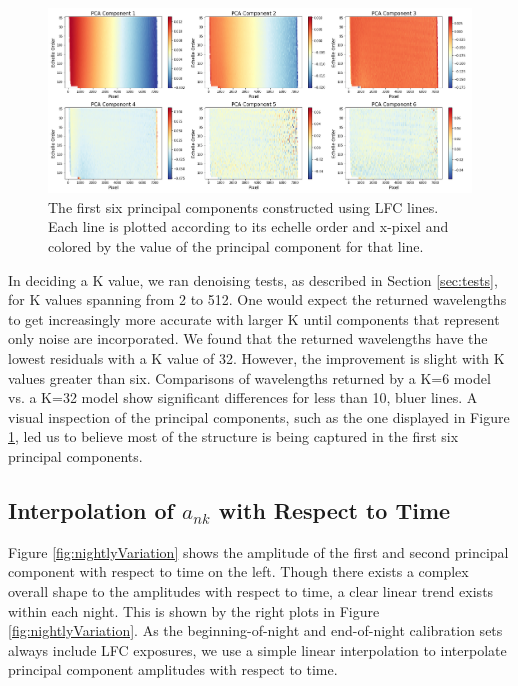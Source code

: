 \documentclass[12pt, onecolumn]{aastex63}
\begin{document}
\begin{figure}[t]
\centering
\includegraphics[width=\textwidth]{Figures/pcsLfc6.png}
\caption{The first six principal components constructed using LFC lines.  Each line is plotted according to its echelle order and x-pixel and colored by the value of the principal component for that line.}
\label{fig:pcLfc}
\end{figure}

In deciding a K value, we ran denoising tests, as described in Section \ref{sec:tests}, for K values spanning from 2 to 512.  One would expect the returned wavelengths to get increasingly more accurate with larger K until components that represent only noise are incorporated.  We found that the returned wavelengths have the lowest residuals with a K value of 32.  However, the improvement is slight with K values greater than six.  Comparisons of wavelengths returned by a K=6 model vs. a K=32 model show significant differences for less than 10, bluer lines.  A visual inspection of the principal components, such as the one displayed in Figure \ref{fig:pcLfc}, led us to believe most of the structure is being captured in the first six principal components.

\subsection{Interpolation of $a_{nk}$ with Respect to Time}
Figure \ref{fig:nightlyVariation} shows the amplitude of the first and second principal component with respect to time on the left.  Though there exists a complex overall shape to the amplitudes with respect to time, a clear linear trend exists within each night.  This is shown by the right plots in Figure  \ref{fig:nightlyVariation}.  As the beginning-of-night and end-of-night calibration sets always include LFC exposures, we use a simple linear interpolation to interpolate principal component amplitudes with respect to time.
\end{document}
